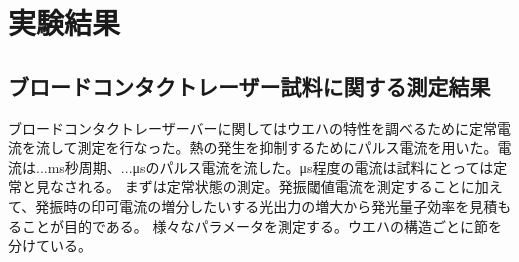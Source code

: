 
\chapter{実験結果}
\section{ブロードコンタクトレーザー試料に関する測定結果}%
ブロードコンタクトレーザーバーに関してはウエハの特性を調べるために定常電流を流して測定を行なった。熱の発生を抑制するためにパルス電流を用いた。電流は...ms秒周期、...μsのパルス電流を流した。μs程度の電流は試料にとっては定常と見なされる。
まずは定常状態の測定。発振閾値電流を測定することに加えて、発振時の印可電流の増分したいする光出力の増大から発光量子効率を見積もることが目的である。
様々なパラメータを測定する。ウエハの構造ごとに節を分けている。
